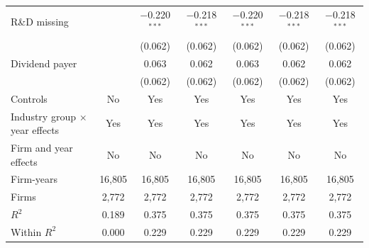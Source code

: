 \begin{tabular}{lcccccc}
R\&D missing &  & $-$0.220$^{***}$ & $-$0.218$^{***}$ & $-$0.220$^{***}$ & $-$0.218$^{***}$ & $-$0.218$^{***}$ \\
 &  & (0.062) & (0.062) & (0.062) & (0.062) & (0.062) \\
Dividend payer &  & 0.063 & 0.062 & 0.063 & 0.062 & 0.062 \\
 &  & (0.062) & (0.062) & (0.062) & (0.062) & (0.062) \\
\midrule
Controls & No & Yes & Yes & Yes & Yes & Yes \\
Industry group $\times$ year effects & Yes & Yes & Yes & Yes & Yes & Yes \\
Firm and year effects & No & No & No & No & No & No \\
Firm-years & 16,805 & 16,805 & 16,805 & 16,805 & 16,805 & 16,805 \\
Firms & 2,772 & 2,772 & 2,772 & 2,772 & 2,772 & 2,772 \\
$R^2$ & 0.189 & 0.375 & 0.375 & 0.375 & 0.375 & 0.375 \\
Within $R^2$ & 0.000 & 0.229 & 0.229 & 0.229 & 0.229 & 0.229 \\
\bottomrule
\end{tabular}
